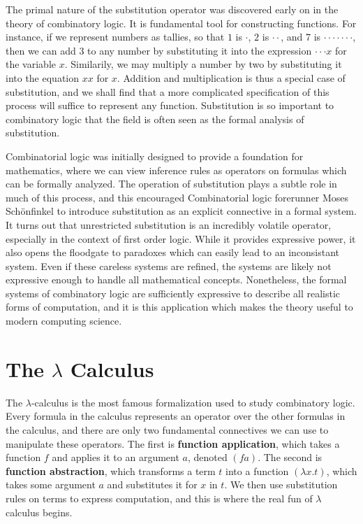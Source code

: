 The primal nature of the substitution operator was discovered early on in the theory of combinatory logic. It is fundamental tool for constructing functions. For instance, if we represent numbers as tallies, so that $1$ is $\cdot$, $2$ is $\cdot \cdot$, and 7 is $\cdot \cdot \cdot \cdot \cdot \cdot \cdot$, then we can add 3 to any number by substituting it into the expression $\cdot \cdot \cdot x$ for the variable $x$. Similarily, we may multiply a number by two by substituting it into the equation $xx$ for $x$. Addition and multiplication is thus a special case of substitution, and we shall find that a more complicated specification of this process will suffice to represent any function. Substitution is so important to combinatory logic that the field is often seen as the formal analysis of substitution.

Combinatorial logic was initially designed to provide a foundation for mathematics, where we can view inference rules as operators on formulas which can be formally analyzed. The operation of substitution plays a subtle role in much of this process, and this encouraged Combinatorial logic forerunner Moses Sch\"{o}nfinkel to introduce substitution as an explicit connective in a formal system. It turns out that unrestricted substitution is an incredibly volatile operator, especially in the context of first order logic. While it provides expressive power, it also opens the floodgate to paradoxes which can easily lead to an inconsistant system. Even if these careless systems are refined, the systems are likely not expressive enough to handle all mathematical concepts. Nonetheless, the formal systems of combinatory logic are sufficiently expressive to describe all realistic forms of computation, and it is this application which makes the theory useful to modern computing science.

\section{The $\lambda$ Calculus}

The $\lambda$-calculus is the most famous formalization used to study combinatory logic. Every formula in the calculus represents an operator over the other formulas in the calculus, and there are only two fundamental connectives we can use to manipulate these operators. The first is {\bf function application}, which takes a function $f$ and applies it to an argument $a$, denoted $(f a)$. The second is {\bf function abstraction}, which transforms a term $t$ into a function $(\lambda x.t)$, which takes some argument $a$ and substitutes it for $x$ in $t$. We then use substitution rules on terms to express computation, and this is where the real fun of $\lambda$ calculus begins.

